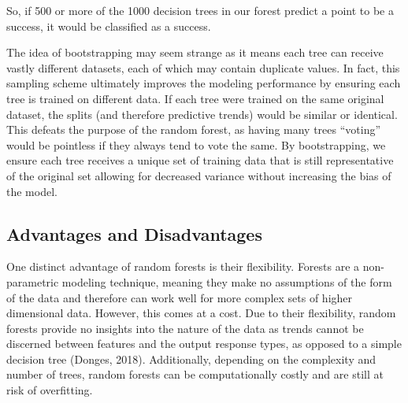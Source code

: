 So, if 500 or more of the 1000 decision trees in our forest predict a point to be a success, it would be classified as a success.

The idea of bootstrapping may seem strange as it means each tree can receive vastly different datasets, each of which may contain duplicate values. In fact, this sampling scheme ultimately improves the modeling performance by ensuring each tree is trained on different data. If each tree were trained on the same original dataset, the splits (and therefore predictive trends) would be similar or identical. This defeats the purpose of the random forest, as having many trees ``voting'' would be pointless if they always tend to vote the same. By bootstrapping, we ensure each tree receives a unique set of training data that is still representative of the original set allowing for decreased variance without increasing the bias of the model.


\subsection{Advantages and Disadvantages}
One distinct advantage of random forests is their flexibility. Forests are a non-parametric modeling technique, meaning they make no assumptions of the form of the data and therefore can work well for more complex sets of higher dimensional data. However, this comes at a cost. Due to their flexibility, random forests provide no insights into the nature of the data as trends cannot be discerned between features and the output response types, as opposed to a simple decision tree (Donges, 2018). Additionally, depending on the complexity and number of trees, random forests can be computationally costly and are still at risk of overfitting. 
